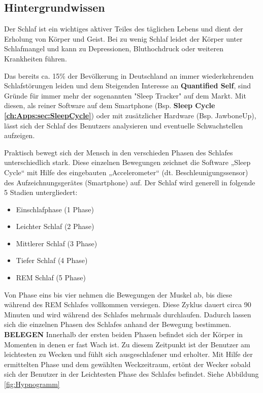 \subsection{Hintergrundwissen}
\label{ch:Apps:sec:Sleepcycle:subsec:H}

Der Schlaf ist ein wichtiges aktiver Teiles des täglichen Lebens und dient der Erholung von Körper und Geist.
Bei zu wenig Schlaf leidet der Körper unter Schlafmangel und kann zu Depressionen, Bluthochdruck oder weiteren Krankheiten führen. \cite{Chen:SleepMonitoring}

Das bereits ca. 15\% der Bevölkerung in Deutschland an immer wiederkehrenden Schlafstörungen leiden und dem Steigenden Interesse an \textbf{Quantified Self}, sind Gründe für immer mehr der sogenannten "Sleep Tracker" auf dem Markt. %
Mit diesen, als reiner Software auf dem Smartphone (Bsp. \textbf{Sleep Cycle \ref{ch:Apps:sec:SleepCycle}}) oder mit zusätzlicher Hardware (Bsp. JawboneUp), lässt sich der Schlaf des Benutzers analysieren und eventuelle Schwachstellen aufzeigen.

Praktisch bewegt sich der Mensch in den verschieden Phasen des Schlafes unterschiedlich stark.
Diese einzelnen Bewegungen zeichnet die Software „Sleep Cycle“ mit Hilfe des eingebauten „Accelerometer“ (dt. Beschleunigungssensor) des Aufzeichnungsgerätes (Smartphone) auf.
Der Schlaf wird generell in folgende 5 Stadien untergliedert:

\begin{itemize}
	\item Einschlafphase (1 Phase)
	\item Leichter Schlaf (2 Phase)
	\item Mittlerer Schlaf (3 Phase)
	\item Tiefer Schlaf (4 Phase)
	\item REM Schlaf (5 Phase)
\end{itemize}

Von Phase eins bis vier nehmen die Bewegungen der Muskel ab, bis diese während des REM Schlafes vollkommen versiegen.
Diese Zyklus dauert circa 90 Minuten und wird während des Schlafes mehrmals durchlaufen.
Dadurch lassen sich die einzelnen Phasen des Schlafes anhand der Bewegung bestimmen. \textbf{BELEGEN}
Innerhalb der ersten beiden Phasen befindet sich der Körper in Momenten in denen er fast Wach ist. Zu diesem Zeitpunkt ist der Benutzer am leichtesten zu Wecken und fühlt sich ausgeschlafener und erholter.
Mit Hilfe der ermittelten Phase und dem gewählten Weckzeitraum, ertönt der Wecker sobald sich der Benutzer in der Leichtesten Phase des Schlafes befindet. Siehe Abbildung \ref{fig:Hypnogramm}


